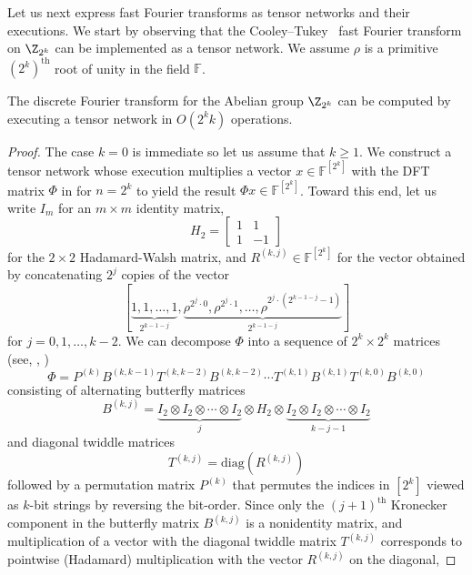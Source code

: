 \documentclass{toc}
\newcommand{\F}{\ensuremath{\mathbb{F}}}
\begin{document}
Let us next express fast Fourier transforms as tensor networks and their
executions.
We start by observing that the Cooley--Tukey~\cite{CooleyT1965} fast
Fourier transform on $\Z_{2^k}$ can be implemented as a tensor network.
We assume $\rho$ is a primitive $(2^k)^\text{th}$ root of unity in
the field $\F$.

\begin{lemma}
\label{lem:fft}
The discrete Fourier transform for the Abelian group $\Z_{2^k}$ can
be computed by executing a tensor network in $O(2^kk)$ operations.
\end{lemma}
\begin{proof}
The case $k=0$ is immediate so let us assume that $k\geq 1$.
We construct a tensor
network whose execution multiplies a vector $x\in\F^{[2^k]}$ with the DFT
matrix $\Phi$ in  for $n=2^k$
to yield the result $\Phi x\in\F^{[2^k]}$.
Toward this end, let us write $I_m$ for an
$m\times m$ identity matrix,
\begin{equation}
\label{eq:h2}
H_2=\left[\begin{array}{rr}1&1\\1&-1\end{array}\right]
\end{equation}
for the $2\times 2$ Hadamard-Walsh matrix, and
$R^{(k,j)}\in\F^{[2^k]}$ for the vector obtained by concatenating
$2^j$ copies of the vector
\[
[\underbrace{1,1,\ldots,1}_{2^{k-1-j}},
 \underbrace{\rho^{2^j\cdot 0},\rho^{2^j\cdot 1},\ldots,\rho^{2^j\cdot(2^{k-1-j}-1)}}_{2^{k-1-j}}]
\]
for $j=0,1,\ldots,k-2$.
%
%
We can decompose $\Phi$ into a sequence
of $2^k\times 2^k$ matrices 
(see, \eg, \cite{VanLoan1992})  %
\begin{equation}
\label{eq:cooley-tukey}
\Phi=P^{(k)}B^{(k,k-1)}T^{(k,k-2)}B^{(k,k-2)}\cdots T^{(k,1)}B^{(k,1)}T^{(k,0)}B^{(k,0)}
\end{equation}
consisting of alternating butterfly matrices
\[
B^{(k,j)}=
\underbrace{I_2\otimes I_2\otimes \cdots\otimes I_2}_{j}
\otimes H_2 \otimes
\underbrace{I_2\otimes I_2\otimes \cdots\otimes I_2}_{k-j-1}
\]
and diagonal twiddle matrices
\[
T^{(k,j)}=\text{diag}(R^{(k,j)})
\]
followed by a permutation matrix $P^{(k)}$ that permutes the indices
in $[2^k]$ viewed as $k$-bit strings by reversing the bit-order.
Since only the $(j+1)^\text{th}$ Kronecker component in the butterfly
matrix $B^{(k,j)}$ is a nonidentity matrix, and multiplication of
a vector with the diagonal twiddle matrix $T^{(k,j)}$
corresponds to pointwise (Hadamard) multiplication with the
vector $R^{(k,j)}$ on the diagonal,

\end{proof}
\end{document}
